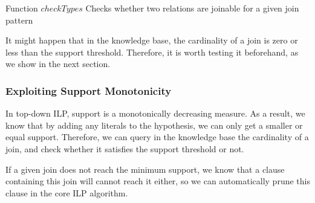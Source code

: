 \begin{algorithm}[h!]
  \caption{Function $checkTypes$ \newline Checks whether two relations are joinable for a given join pattern}
   {
  }
   {
  }
 \label{alg1}
\end{algorithm}

It might happen that in the knowledge base, the cardinality of a join is zero or less than
the support threshold. Therefore, it is worth testing it beforehand, as we show in the next section.

\subsubsection{Exploiting Support Monotonicity}

In top-down ILP, support is a monotonically decreasing measure. As a result, we know that by adding any
literals to the hypothesis, we can only get a smaller or equal support. Therefore, we can query in the knowledge base
the cardinality of a join, and check whether it satisfies the support threshold or not.

If a given join does not reach the minimum support, we know that a clause containing this join will cannot reach it
either, so we can automatically prune this clause in the core ILP algorithm.

